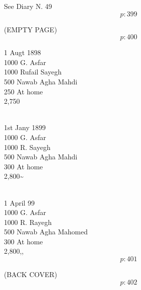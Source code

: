 \documentclass{report}
\begin{document}
	\par{
 	See Diary N. 49\ \\
  \[p: 399 \]

	}

	\par{
 	(EMPTY PAGE)\ \\
  \[p: 400 \]

	}

	\par{
 	1 Augt 1898\ \\1000 G. Asfar\ \\1000 Rufail Sayegh\ \\500 Nawab Agha Mahdi\ \\250 At home\ \\2,750\ \\\ \\
	}

	\par{
 	1st Jany 1899\ \\1000 G. Asfar\ \\1000 R. Sayegh\ \\500 Nawab Agha Mahdi\ \\300 At home\ \\2,800\~{}\ \\\ \\
	}

	\par{
 	1 April 99\ \\1000 G. Asfar\ \\1000 R. Rayegh\ \\500 Nawab Agha Mahomed\ \\300 At home\ \\2,800,,\ \\
  \[p: 401 \]

	}

	\par{
 	(BACK COVER)\ \\
  \[p: 402 \]

	}

 
 
\end{document}
